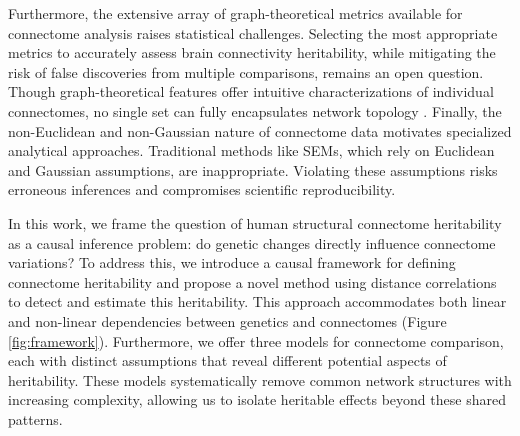 Furthermore, the extensive array of graph-theoretical metrics available for connectome analysis raises statistical challenges. Selecting the most appropriate metrics to accurately assess brain connectivity heritability, while mitigating the risk of false discoveries from multiple comparisons, remains an open question. Though graph-theoretical features offer intuitive characterizations of individual connectomes, no single set can fully encapsulates network topology \cite{chung2021statistical}. Finally, the non-Euclidean and non-Gaussian nature of connectome data motivates specialized analytical approaches. Traditional methods like SEMs, which rely on Euclidean and Gaussian assumptions, are inappropriate.  Violating these assumptions risks erroneous inferences and compromises scientific reproducibility.

In this work, we frame the question of human structural connectome heritability as a causal inference problem: do genetic changes directly influence connectome variations? To address this, we introduce a causal framework for defining connectome heritability and propose a novel method using distance correlations to detect and estimate this heritability. This approach accommodates both linear and non-linear dependencies between genetics and connectomes (Figure \ref{fig:framework}). Furthermore, we offer three models for connectome comparison, each with distinct assumptions that reveal different potential aspects of heritability. These models systematically remove common network structures with increasing complexity, allowing us to isolate heritable effects beyond these shared patterns. 

